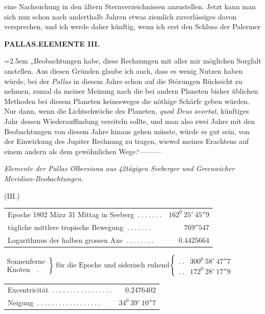 eine Nachsuchung in den ältern Sternverzeichnissen anzustellen. Jetzt kann man sich nun schon nach anderthalb Jahren etwas ziemlich zuverlässiges davon versprechen, und ich werde daher künftig, wenn ich erst den Schluss der Palermer
\par
{}
\clearpage
\thispagestyle{empty}
\noindent{}%
%
\parbox[t]{\dimexpr\linewidth-24mm\relax}{\centering\footnotesize\bfseries PALLAS.\enspace ELEMENTE III.\par}%
\makebox[12mm][r]{}\par\nobreak\medskip
\begingroup\emergencystretch=2.5em
\noindent „Beobachtungen habe, diese Rechnungen mit aller mir möglichen Sorgfalt anstellen. Aus diesen Gründen glaube ich auch, dass es wenig Nutzen haben würde, bei der \textit{Pallas} in diesem Jahre schon auf die Störungen Rücksicht zu nehmen, zumal da meiner Meinung nach die bei andern Planeten bisher üblichen Methoden bei diesem Planeten keinesweges die nöthige Schärfe geben würden. Nur dann, wenn die Lichtschwäche des Planeten, \textit{quod Deus avortat}, künftiges Jahr dessen Wiederauffindung vereiteln sollte, und man also zwei Jahre mit den Beobachtungen von diesem Jahre hinaus gehen müsste, würde es gut sein, von der Einwirkung des Jupiter Rechnung zu tragen, wiewol meines Erachtens auf einem andern als dem gewöhnlichen Wege.“\quad —\quad —\quad —\par\endgroup

\begin{center}
\textit{Elemente der Pallas Olbersiana aus 42tägigen Seeberger und Greenwicher Meridian-Beobachtungen.}\par\medskip
(III.)\par\medskip
{\small\setlength{\tabcolsep}{2pt}
\begin{tabular}{l r}
Epoche 1802 März 31 Mittag in Seeberg $\ .\ .\ .\ .\ .\ .\ .$&$162^0\ 25'\ 45''9$\\
tägliche mittlere tropische Bewegung $\ .\ .\ .\ .\ .\ .\ .$&$769''547$\\
Logarithmus der halben grossen Axe $\ .\ .\ .\ .\ .\ .\ .\ .$&$0.4425664$
\end{tabular}
\par\smallskip
$\left.\begin{array}{l}\text{Sonnenferne}\\\text{Knoten}\quad .\end{array}\right\}\ \text{für die Epoche und siderisch ruhend}\left\{\begin{array}{lr}
.\ .&300^0\ 58'\ 47''7\\
.\ .&172^0\ 28'\ 17''9
\end{array}\right.$
\par\smallskip
\begin{tabular}{l r}
Excentricität $\ .\ .\ .\ .\ .\ .\ .\ .\ .\ .\ .\ .\ .\ .\ .\ .\ .$&$0.2476402$\\
Neigung $\ .\ .\ .\ .\ .\ .\ .\ .\ .\ .\ .\ .\ .\ .\ .\ .\ .\ .$&$34^0\ 39'\ 10''7$
\end{tabular}}
\end{center}

